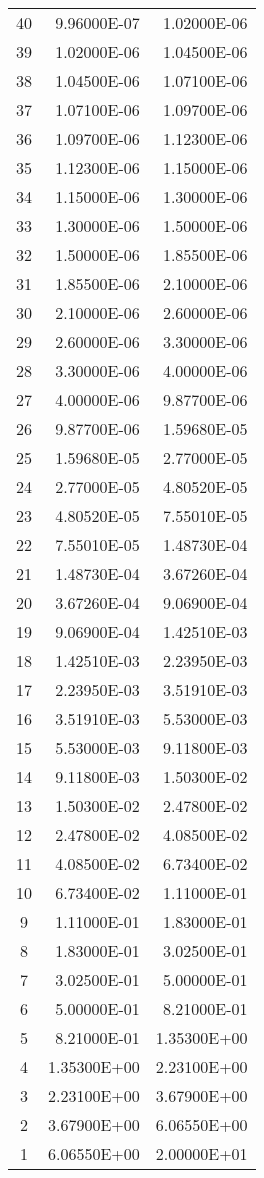 \begin{appendices}
{\begin{longtable}[h!]{c r r}
40 & 9.96000E-07 & 1.02000E-06 \\
39 & 1.02000E-06 & 1.04500E-06 \\
38 & 1.04500E-06 & 1.07100E-06 \\
37 & 1.07100E-06 & 1.09700E-06 \\
36 & 1.09700E-06 & 1.12300E-06 \\
35 & 1.12300E-06 & 1.15000E-06 \\
34 & 1.15000E-06 & 1.30000E-06 \\
33 & 1.30000E-06 & 1.50000E-06 \\
32 & 1.50000E-06 & 1.85500E-06 \\
31 & 1.85500E-06 & 2.10000E-06 \\
30 & 2.10000E-06 & 2.60000E-06 \\
29 & 2.60000E-06 & 3.30000E-06 \\
28 & 3.30000E-06 & 4.00000E-06 \\
27 & 4.00000E-06 & 9.87700E-06 \\
26 & 9.87700E-06 & 1.59680E-05 \\
25 & 1.59680E-05 & 2.77000E-05 \\
24 & 2.77000E-05 & 4.80520E-05 \\
23 & 4.80520E-05 & 7.55010E-05 \\
22 & 7.55010E-05 & 1.48730E-04 \\
21 & 1.48730E-04 & 3.67260E-04 \\
20 & 3.67260E-04 & 9.06900E-04 \\
19 & 9.06900E-04 & 1.42510E-03 \\
18 & 1.42510E-03 & 2.23950E-03 \\
17 & 2.23950E-03 & 3.51910E-03 \\
16 & 3.51910E-03 & 5.53000E-03 \\
15 & 5.53000E-03 & 9.11800E-03 \\
14 & 9.11800E-03 & 1.50300E-02 \\
13 & 1.50300E-02 & 2.47800E-02 \\
12 & 2.47800E-02 & 4.08500E-02 \\
11 & 4.08500E-02 & 6.73400E-02 \\
10 & 6.73400E-02 & 1.11000E-01 \\
9 & 1.11000E-01 & 1.83000E-01 \\
8 & 1.83000E-01 & 3.02500E-01 \\
7 & 3.02500E-01 & 5.00000E-01 \\
6 & 5.00000E-01 & 8.21000E-01 \\
5 & 8.21000E-01 & 1.35300E+00 \\
4 & 1.35300E+00 & 2.23100E+00 \\
3 & 2.23100E+00 & 3.67900E+00 \\
2 & 3.67900E+00 & 6.06550E+00 \\
1 & 6.06550E+00 & 2.00000E+01 \\
  \bottomrule
\end{longtable}}


\end{appendices}
